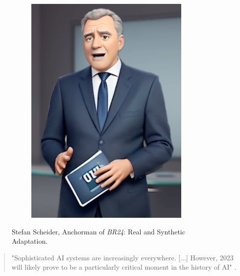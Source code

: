 \documentclass[
  a4paper,  %
  twoside,  %
  bibliography=totoc,
  headsepline,
  cleardoublepage=empty,
  parskip=half,
  draft=false
]{scrbook}
\begin{document}
\begin{figure}[h]
\begin{subfigure}[b]{0.4\textwidth}
    \includegraphics[width=\textwidth]{./graphics/scheider-sd.png}
  \end{subfigure}
  \caption{Stefan Scheider, Anchorman of \textit{BR24}: Real and Synthetic Adaptation.}
  \label{fig:scheider-real-sd}
\end{figure}

\begin{quotation}
"Sophisticated AI systems are increasingly everywhere. [...] However, 2023 will likely prove to be a particularly critical moment in the history of AI" \cite{arguedasAutomatingDemocracyGenerative2023}.
\end{quotation}
\end{document}
